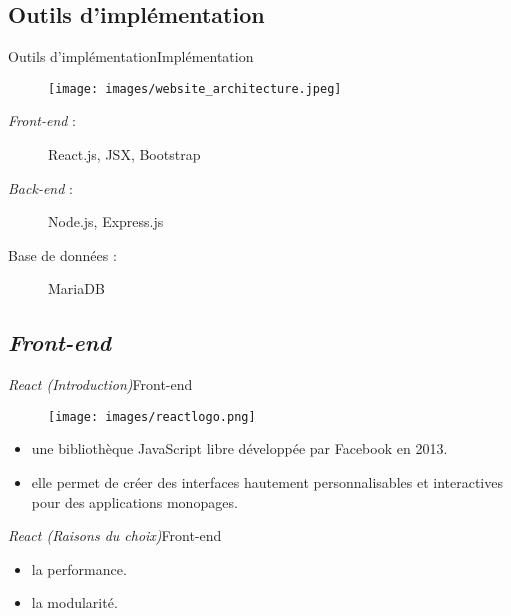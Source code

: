 \documentclass[usenames,dvipsnames]{beamer}
\begin{document}
\subsection{Outils d'implémentation}
\begin{frame}{Outils d'implémentation}{Implémentation}
  \begin{figure}[!ht]
    \centering
    \texttt{[image: images/website\_architecture.jpeg]}
  \end{figure}

  \begin{description}
    \item [\textit{Front-end} :] React.js, JSX, Bootstrap
    \item [\textit{Back-end} :] Node.js, Express.js
    \item [Base de données :] MariaDB
  \end{description}
\end{frame}
\subsection{\protect\textit{Front-end}}
\begin{frame}{\textit{React (Introduction)}}{Front-end}
  \begin{figure}[!ht]
    \texttt{[image: images/reactlogo.png]}
  \end{figure}

  \begin{itemize}
    \item une bibliothèque JavaScript libre développée par Facebook en 2013.
    \item elle permet de créer des interfaces hautement personnalisables et interactives pour des applications monopages.
  \end{itemize}
\end{frame}

\begin{frame}{\textit{React (Raisons du choix)}}{Front-end}
  \begin{itemize}
    \item la performance.
    \item la modularité.
  \end{itemize}
\end{frame}
\end{document}
